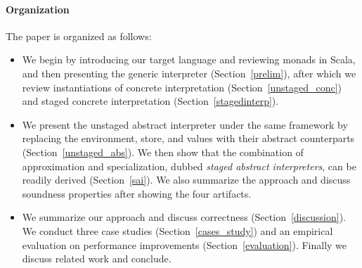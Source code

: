 \paragraph{Organization} The paper is organized as follows:
\begin{itemize}[leftmargin=2em]
  \item We begin by introducing our target language and reviewing
    monads in Scala, and then presenting the generic interpreter
    (Section~\ref{prelim}), after which we review instantiations
    of concrete interpretation (Section~\ref{unstaged_conc}) and
    staged concrete interpretation (Section~\ref{stagedinterp}).
  \item We present the unstaged abstract interpreter under the same
    framework by replacing the environment, store, and values with their
    abstract counterparts (Section~\ref{unstaged_abs}). We then
    show that the combination of approximation and specialization, dubbed
    \textit{staged abstract interpreters}, can be readily derived
    (Section~\ref{sai}). We also summarize the approach and discuss
    soundness properties after showing the four artifacts.
  \item We summarize our approach and discuss correctness (Section~\ref{discussion}).
    We conduct three case studies (Section~\ref{cases_study}) and
    an empirical evaluation on performance improvements (Section~\ref{evaluation}).
    Finally we discuss related work and conclude.
\end{itemize}

\iffalse
On the other side, static analysis is a trade-off between performance and
precision: higher precision usually leads to longer running time.

4. Existing method to improve the performance is adhoc, engineering heavy, require to rewrite the optimized version, therefore harder to reason about the correctness
6. program analyzers are also meta-programs, they manipulate other programs as data objects
\fi
